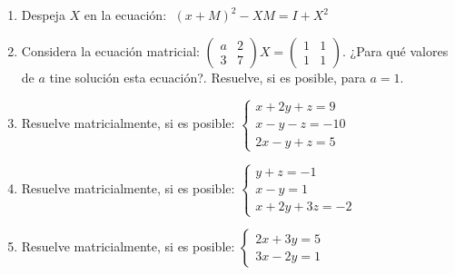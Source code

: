 \begin{enumerate}

\item Despeja $X$ en la ecuación: $\; (x+M)^2-XM=I+X^2$


\item Considera la ecuación matricial: $\left( \begin{matrix} a&2\\3&7 \end{matrix} \right)X=\left( \begin{matrix} 1&1\\1&1 \end{matrix} \right)$. ¿Para qué valores de $a$ tine solución esta ecuación?. Resuelve, si es posible, para $a=1$.





\item Resuelve matricialmente, si es posible: $\begin{cases}  x+2y+z=9\\x-y-z=-10\\2x-y+z=5 \end{cases}$

\rightline{\textcolor{gris}{Solución: $x=-1; \; y=1; \; z=8$.}}

\item Resuelve matricialmente, si es posible: $\begin{cases}  y+z=-1\\x-y=1\\x+2y+3z=-2 \end{cases}$


\rightline{\textcolor{gris}{Solución: No es posible .}}

\item Resuelve matricialmente, si es posible: $\begin{cases} 2x+3y=5\\3x-2y=1  \end{cases}$


\rightline{\textcolor{gris}{Solución: $x=1; \; y=1 $.}}


\end{enumerate}
